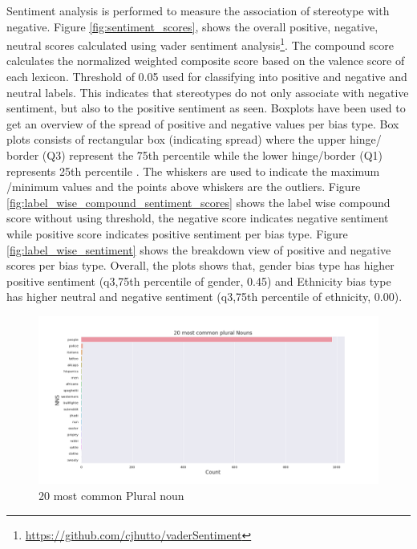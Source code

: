 Sentiment analysis is performed to measure the association of stereotype with negative. Figure \ref{fig:sentiment_scores}, shows the overall positive, negative, neutral scores calculated using vader sentiment analysis\footnote{\url{https://github.com/cjhutto/vaderSentiment}}. The compound score calculates the normalized weighted composite score based on the valence score of each lexicon. Threshold of 0.05 used for classifying into positive and negative and neutral labels. This indicates that stereotypes do not only associate with negative sentiment, but also to the positive sentiment as seen. Boxplots have been used to get an overview of the spread of positive and negative values per bias type. Box plots consists of rectangular box (indicating spread) where the upper hinge/ border (Q3) represent the 75th percentile while the lower hinge/border (Q1) represents 25th percentile \cite{kurzl1988exploratory}. The whiskers are used to indicate the maximum /minimum values and the points above whiskers are the outliers. Figure \ref{fig:label_wise_compound_sentiment_scores} shows the label wise compound score without using threshold, the negative score indicates negative sentiment while positive score indicates positive sentiment per bias type. Figure \ref{fig:label_wise_sentiment} shows the breakdown view of positive and negative scores per bias type. Overall, the plots shows that, gender bias type has higher positive sentiment (q3,75th percentile of gender, 0.45) and Ethnicity bias type has higher neutral and negative sentiment (q3,75th percentile of ethnicity, 0.00).

\begin{figure}[h!]
    \centering
    \includegraphics[width=1\textwidth]{thesis/figures/20 most common plural Nouns.png}
    \caption{20 most common Plural noun}
    \label{fig:plural_nouns}
\end{figure}

